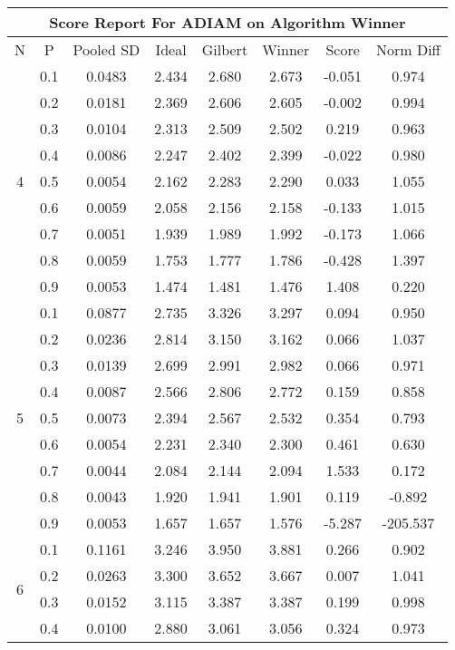 \documentclass[11pt,a4paper]{report}
\begin{document}
\begin{longtable}{ | c | c || c | c | c | c | c | c | }
\hline
\multicolumn{8}{|c|}{ Score Report For ADIAM on Algorithm Winner} \\
\hline
N & P & Pooled SD &  Ideal &  Gilbert & Winner  & Score & Norm Diff \\
 \hline
 \hline
 \endhead
\multirow{9}{*}{4} & 0.1 & 0.0483 & 2.434 & 2.680 & 2.673 & -0.051 & 0.974 \\
 & 0.2 & 0.0181 & 2.369 & 2.606 & 2.605 & -0.002 & 0.994 \\
 & 0.3 & 0.0104 & 2.313 & 2.509 & 2.502 & 0.219 & 0.963 \\
 & 0.4 & 0.0086 & 2.247 & 2.402 & 2.399 & -0.022 & 0.980 \\
 & 0.5 & 0.0054 & 2.162 & 2.283 & 2.290 & 0.033 & 1.055 \\
 & 0.6 & 0.0059 & 2.058 & 2.156 & 2.158 & -0.133 & 1.015 \\
 & 0.7 & 0.0051 & 1.939 & 1.989 & 1.992 & -0.173 & 1.066 \\
 & 0.8 & 0.0059 & 1.753 & 1.777 & 1.786 & -0.428 & 1.397 \\
 & 0.9 & 0.0053 & 1.474 & 1.481 & 1.476 & 1.408 & 0.220 \\
 \hline
\multirow{9}{*}{5} & 0.1 & 0.0877 & 2.735 & 3.326 & 3.297 & 0.094 & 0.950 \\
 & 0.2 & 0.0236 & 2.814 & 3.150 & 3.162 & 0.066 & 1.037 \\
 & 0.3 & 0.0139 & 2.699 & 2.991 & 2.982 & 0.066 & 0.971 \\
 & 0.4 & 0.0087 & 2.566 & 2.806 & 2.772 & 0.159 & 0.858 \\
 & 0.5 & 0.0073 & 2.394 & 2.567 & 2.532 & 0.354 & 0.793 \\
 & 0.6 & 0.0054 & 2.231 & 2.340 & 2.300 & 0.461 & 0.630 \\
 & 0.7 & 0.0044 & 2.084 & 2.144 & 2.094 & 1.533 & 0.172 \\
 & 0.8 & 0.0043 & 1.920 & 1.941 & 1.901 & 0.119 & -0.892 \\
 & 0.9 & 0.0053 & 1.657 & 1.657 & 1.576 & -5.287 & -205.537 \\
 \hline
\multirow{9}{*}{6} & 0.1 & 0.1161 & 3.246 & 3.950 & 3.881 & 0.266 & 0.902 \\
 & 0.2 & 0.0263 & 3.300 & 3.652 & 3.667 & 0.007 & 1.041 \\
 & 0.3 & 0.0152 & 3.115 & 3.387 & 3.387 & 0.199 & 0.998 \\
 & 0.4 & 0.0100 & 2.880 & 3.061 & 3.056 & 0.324 & 0.973 \\

\end{longtable}
\end{document}
